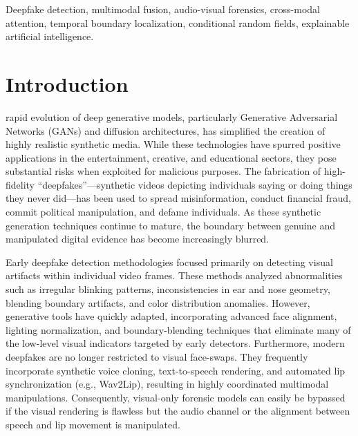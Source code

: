 \documentclass[journal,10pt,onecolumn,draftclsnofoot]{IEEEtran}
\begin{document}
\begin{IEEEkeywords}
Deepfake detection, multimodal fusion, audio-visual forensics, cross-modal attention, temporal boundary localization, conditional random fields, explainable artificial intelligence.
\end{IEEEkeywords}

\section{Introduction}
 rapid evolution of deep generative models, particularly Generative Adversarial Networks (GANs) and diffusion architectures, has simplified the creation of highly realistic synthetic media. While these technologies have spurred positive applications in the entertainment, creative, and educational sectors, they pose substantial risks when exploited for malicious purposes. The fabrication of high-fidelity ``deepfakes''—synthetic videos depicting individuals saying or doing things they never did—has been used to spread misinformation, conduct financial fraud, commit political manipulation, and defame individuals. As these synthetic generation techniques continue to mature, the boundary between genuine and manipulated digital evidence has become increasingly blurred.

Early deepfake detection methodologies focused primarily on detecting visual artifacts within individual video frames. These methods analyzed abnormalities such as irregular blinking patterns, inconsistencies in ear and nose geometry, blending boundary artifacts, and color distribution anomalies. However, generative tools have quickly adapted, incorporating advanced face alignment, lighting normalization, and boundary-blending techniques that eliminate many of the low-level visual indicators targeted by early detectors. Furthermore, modern deepfakes are no longer restricted to visual face-swaps. They frequently incorporate synthetic voice cloning, text-to-speech rendering, and automated lip synchronization (e.g., Wav2Lip), resulting in highly coordinated multimodal manipulations. Consequently, visual-only forensic models can easily be bypassed if the visual rendering is flawless but the audio channel or the alignment between speech and lip movement is manipulated.
\end{document}
